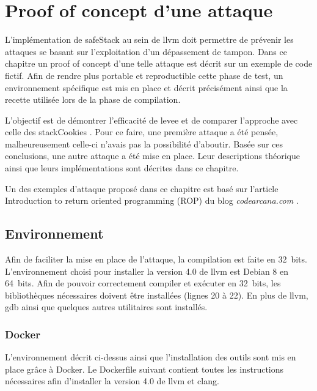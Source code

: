 \chapter{Proof of concept d'une attaque}
\label{chap:attaque}

L'implémentation de \og \gls{safeStack} \fg au sein de \gls{llvm} doit permettre de prévenir les attaques se basant sur l'exploitation d'un dépassement de tampon. Dans ce chapitre un \og proof of concept \fg d'une telle attaque est décrit sur un exemple de code fictif. Afin de rendre plus portable et reproductible cette phase de test, un environnement spécifique est mis en place et décrit précisément ainsi que la recette utilisée lors de la phase de compilation.

L'objectif est de démontrer l'efficacité de \gls{levee} et de comparer l'approche avec celle des \og \gls{stackCookies} \fg. Pour ce faire, une première attaque a été pensée, malheureusement celle-ci n'avais pas la possibilité d'aboutir. Basée sur ces conclusions, une autre attaque a été mise en place. Leur descriptions théorique ainsi que leurs implémentations sont décrites dans ce chapitre.

Un des exemples d'attaque proposé dans ce chapitre est basé sur l'article \og Introduction to return oriented programming (ROP) \fg du blog \textit{codearcana.com} \cite{IntroductionToROP}.

\minitoc

\newpage

\section{Environnement}

Afin de faciliter la mise en place de l'attaque, la compilation est faite en 32~bits. L'environnement choisi pour installer la version 4.0 de \gls{llvm} est Debian 8 en 64~bits. Afin de pouvoir correctement compiler et exécuter en 32~bits, les bibliothèques nécessaires doivent être installées (lignes 20 à 22). En plus de \gls{llvm}, \gls{gdb} ainsi que quelques autres utilitaires sont installés.

\subsection{Docker}

L'environnement décrit ci-dessus ainsi que l'installation des outils sont mis en place grâce à Docker. Le Dockerfile suivant contient toutes les instructions nécessaires afin d'installer la version 4.0 de \gls{llvm} et \gls{clang}.

